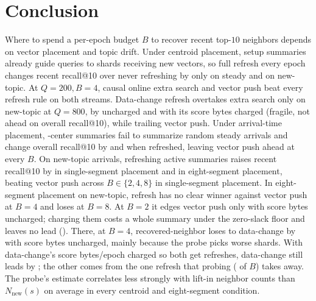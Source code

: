 \section{Conclusion}
\label{sec:conclusion}

Where to spend a per-epoch budget $B$ to recover recent top-$10$ neighbors depends on vector placement and topic drift. Under centroid placement, setup summaries already guide queries to shards receiving new vectors, so full refresh every epoch changes recent recall@10 over never refreshing by only \RNumHOneGapSteady{} on steady and \RNumHOneGapNewTopic{} on new-topic. At $Q = 200, B = 4$, causal online extra search and vector push beat every refresh rule on both streams. Data-change refresh overtakes extra search only on new-topic at $Q = 800$, by \RNumQSweepRefMinusESQEightHundredNewTopicAbsMean{} uncharged and \RNumAddThreeXFourESNewTopicAbsMean{} with its score bytes charged (fragile, not ahead on overall recall@10), while trailing vector push. Under arrival-time placement, \RNumCentersPerSummary{}-center summaries fail to summarize random steady arrivals and change overall recall@10 by \RNumGateMTwoOverallSteady{} and \RNumGateMThreeOverallSteady{} when refreshed, leaving vector push ahead at every $B$. On new-topic arrivals, refreshing active summaries raises recent recall@10 by \RNumGateMTwoNewTopic{} in single-segment placement and \RNumGateMThreeNewTopic{} in eight-segment placement, beating vector push across $B \in \{2, 4, 8\}$ in single-segment placement. In eight-segment placement on new-topic, refresh has no clear winner against vector push at $B = 4$ and loses at $B = 8$. At $B = 2$ it edges vector push only with score bytes uncharged; charging them costs a whole summary under the zero-slack floor and leaves no lead (\RNumAddThreeXTwoPVBTwoNewTopic{}). There, at $B = 4$, recovered-neighbor loses to data-change by \RNumHThreeBRNMinusDCNewTopic{} with score bytes uncharged, mainly because the probe picks worse shards. With data-change's \RNumDCScoreEpochBytes{} score bytes/epoch charged so both get \RNumRNSummariesBFour{} refreshes, data-change still leads by \RNumAddThreeXOneRNBFourNewTopic{}; the other \RNumAddThreeXThreeDCBFourNewTopicAbsMean{} comes from the one refresh that probing (\RNumRNOverheadShareBFour{} of $B$) takes away. The probe's estimate correlates less strongly with lift-in neighbor counts than $N_{\text{new}}(s)$ on average in every centroid and eight-segment condition.

